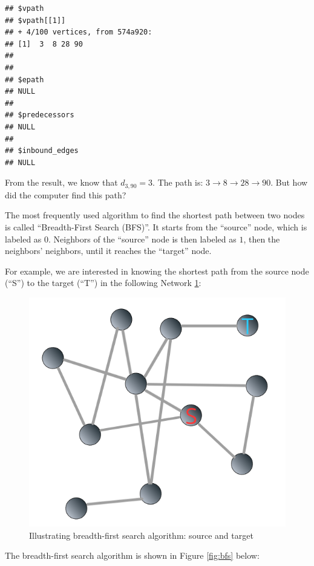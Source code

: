 \documentclass[
]{krantz}
\begin{document}
\begin{verbatim}
## $vpath
## $vpath[[1]]
## + 4/100 vertices, from 574a920:
## [1]  3  8 28 90
## 
## 
## $epath
## NULL
## 
## $predecessors
## NULL
## 
## $inbound_edges
## NULL
\end{verbatim}

From the result, we know that \(d_{3, 90} = 3\). The path is: \(3 \to 8 \to 28 \to 90\). But how did the computer find this path?

The most frequently used algorithm to find the shortest path between two nodes is called ``Breadth-First Search (BFS)''. It starts from the ``source'' node, which is labeled as \(0\). Neighbors of the ``source'' node is then labeled as \(1\), then the neighbors' neighbors, until it reaches the ``target'' node.

For example, we are interested in knowing the shortest path from the source node (``S'') to the target (``T'') in the following Network \ref{fig:bfs01}:

\begin{figure}

{\centering \includegraphics[width=0.55\linewidth]{images/bfs01} 

}

\caption{Illustrating breadth-first search algorithm: source and target}\label{fig:bfs01}
\end{figure}

The breadth-first search algorithm is shown in Figure \ref{fig:bfs} below:
\end{document}
